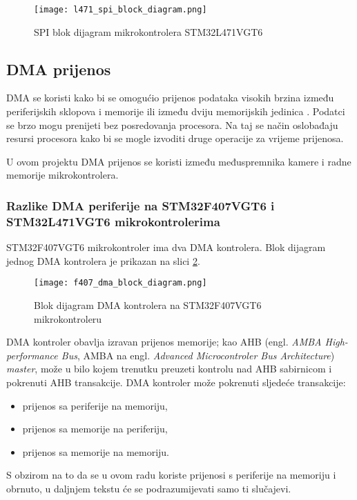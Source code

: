 \begin{figure}[H]
	\centering
	\texttt{[image: l471\_spi\_block\_diagram.png]}
	\caption{SPI blok dijagram mikrokontrolera STM32L471VGT6 \cite[str. 1451]{l471_manual}}
	\label{fig:l471_spi_block_diagram}
\end{figure}


\subsection{DMA prijenos}

DMA se koristi kako bi se omogućio prijenos podataka visokih brzina između periferijskih sklopova i memorije ili između dviju memorijskih jedinica \cite{f407_manual}. Podatci se brzo mogu prenijeti bez posredovanja procesora. Na taj se način oslobađaju resursi procesora kako bi se mogle izvoditi druge operacije za vrijeme prijenosa.

U ovom projektu DMA prijenos se koristi između međuspremnika kamere i radne memorije mikrokontrolera.

\subsubsection{Razlike DMA periferije na STM32F407VGT6 i \\ STM32L471VGT6 mikrokontrolerima}

STM32F407VGT6 mikrokontroler ima dva DMA kontrolera. Blok dijagram jednog DMA kontrolera je prikazan na slici \ref{fig:f407_dma_block_diagram}.

\begin{figure}[H]
	\centering
	\texttt{[image: f407\_dma\_block\_diagram.png]}
	\caption{Blok dijagram DMA kontrolera na STM32F407VGT6 mikrokontroleru \cite{f407_manual}}
	\label{fig:f407_dma_block_diagram}
\end{figure}

DMA kontroler obavlja izravan prijenos memorije; kao AHB (engl. \textit{AMBA High-performance Bus}, AMBA na engl. \textit{Advanced Microcontroler Bus Architecture}) \textit{master}, može u bilo kojem trenutku preuzeti kontrolu nad AHB sabirnicom i pokrenuti AHB transakcije. DMA kontroler može pokrenuti sljedeće transakcije:
\begin{itemize}
	\item prijenos sa periferije na memoriju,
	\item prijenos sa memorije na periferiju,
	\item prijenos sa memorije na memoriju.
\end{itemize}
S obzirom na to da se u ovom radu koriste prijenosi s periferije na memoriju i obrnuto, u daljnjem tekstu će se podrazumijevati samo ti slučajevi.

